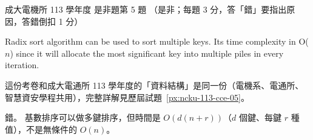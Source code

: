 \begin{pastexam}[label={px:ncku-113-ee-05}]{成大電機所 113 學年度 是非題第 5 題}
（是非；每題 3 分，答「錯」要指出原因，答錯倒扣 1 分）

Radix sort algorithm can be used to sort multiple keys. Its time complexity in O($n$) since it
will allocate the most significant key into multiple piles in every iteration.
\end{pastexam}

\begin{pastsoln}
這份考卷和成大電通所 113 學年度的「資料結構」是同一份（電機系、電通所、智慧資安學程共用），完整詳解見歷屆試題~\ref{px:ncku-113-cce-05}。

錯。 基數排序可以做多鍵排序，但時間是 $O(d(n + r))$（$d$ 個鍵、每鍵 $r$ 種值），不是無條件的 $O(n)$。
\end{pastsoln}

